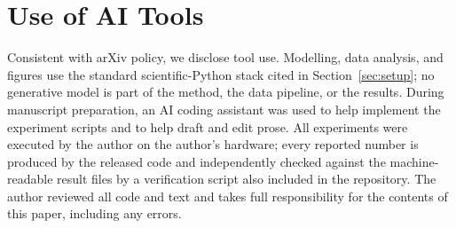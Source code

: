 \documentclass[conference]{IEEEtran}
\begin{document}
\section{Use of AI Tools}
\label{app:aitools}
Consistent with arXiv policy, we disclose tool use. Modelling, data analysis,
and figures use the standard scientific-Python stack cited in
Section~\ref{sec:setup}; no generative model is part of the method, the data
pipeline, or the results. During manuscript preparation, an AI coding assistant
was used to help implement the experiment scripts and to help draft and edit
prose. All experiments were executed by the author on the author's hardware;
every reported number is produced by the released code and independently checked
against the machine-readable result files by a verification script also included
in the repository. The author reviewed all code and text and takes full
responsibility for the contents of this paper, including any errors.



\end{document}
